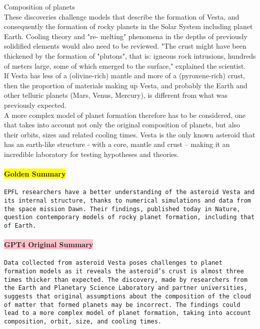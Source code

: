 {Composition of planets \\
These discoveries challenge models that describe the formation of Vesta, and consequently the formation of rocky planets in the Solar System including planet Earth. Cooling theory and "re- melting" phenomena in the depths of previously solidified elements would also need to be reviewed. "The crust might have been thickened by the formation of "plutons", that is: igneous rock intrusions, hundreds of meters large, some of which emerged to the surface," explained the scientist. \\
If Vesta has less of a (olivine-rich) mantle and more of a (pyroxene-rich) crust, then the proportion of materials making up Vesta, and probably the Earth and other telluric planets (Mars, Venus, Mercury), is different from what was previously expected. \\
A more complex model of planet formation therefore has to be considered, one that takes into account not only the original composition of planets, but also their orbits, sizes and related cooling times. Vesta is the only known asteroid that has an earth-like structure - with a core, mantle and crust – making it an incredible laboratory for testing hypotheses and theories.}

\paragraph{\colorbox{yellow}{Golden Summary}}
\texttt{EPFL researchers have a better understanding of the asteroid Vesta and its internal structure, thanks to numerical simulations and data from the space mission Dawn. Their findings, published today in Nature, question contemporary models of rocky planet formation, including that of Earth.}

\paragraph{\colorbox{pink}{GPT4 Original Summary}}
\texttt{Data collected from asteroid Vesta poses challenges to planet formation models as it reveals the asteroid's crust is almost three times thicker than expected. The discovery, made by researchers from the Earth and Planetary Science Laboratory and partner universities, suggests that original assumptions about the composition of the cloud of matter that formed planets may be incorrect. The findings could lead to a more complex model of planet formation, taking into account composition, orbit, size, and cooling times.}

